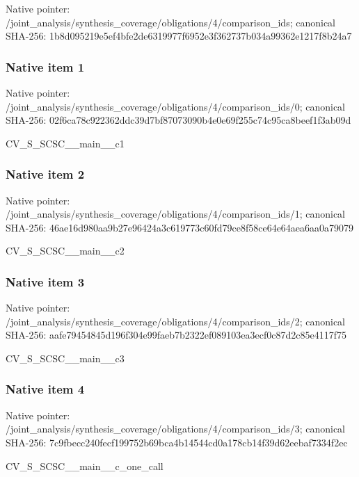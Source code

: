 \documentclass[10pt,a4paper]{article}
\begin{document}
Native pointer: /joint\_analysis/synthesi\allowbreak{}s\_coverage/obligations/4\allowbreak{}/comparison\_ids; canonical SHA-256: 1b8d095219e5ef4bfe2de631\allowbreak{}9977f6952e3f362737b034a9\allowbreak{}9362e1217f8b24a7



\subsubsection{Native item 1}


Native pointer: /joint\_analysis/synthesi\allowbreak{}s\_coverage/obligations/4\allowbreak{}/comparison\_ids/0; canonical SHA-256: 02f6ca78c922362ddc39d7bf\allowbreak{}87073090b4e0e69f255c74c9\allowbreak{}5ca8beef1f3ab09d


CV\_S\_SCSC\_\_main\_\_c1


\subsubsection{Native item 2}


Native pointer: /joint\_analysis/synthesi\allowbreak{}s\_coverage/obligations/4\allowbreak{}/comparison\_ids/1; canonical SHA-256: 46ae16d980aa9b27e96424a3\allowbreak{}c619773c60fd79ce8f58ce64\allowbreak{}e64aea6aa0a79079


CV\_S\_SCSC\_\_main\_\_c2


\subsubsection{Native item 3}


Native pointer: /joint\_analysis/synthesi\allowbreak{}s\_coverage/obligations/4\allowbreak{}/comparison\_ids/2; canonical SHA-256: aafe79454845d196f304e99f\allowbreak{}aeb7b2322ef089103ea3ecf0\allowbreak{}c87d2c85e4117f75


CV\_S\_SCSC\_\_main\_\_c3


\subsubsection{Native item 4}


Native pointer: /joint\_analysis/synthesi\allowbreak{}s\_coverage/obligations/4\allowbreak{}/comparison\_ids/3; canonical SHA-256: 7c9fbecc240fecf199752b69\allowbreak{}bca4b14544cd0a178cb14f39\allowbreak{}d62eebaf7334f2ec


CV\_S\_SCSC\_\_main\_\_c\_one\_call
\end{document}

